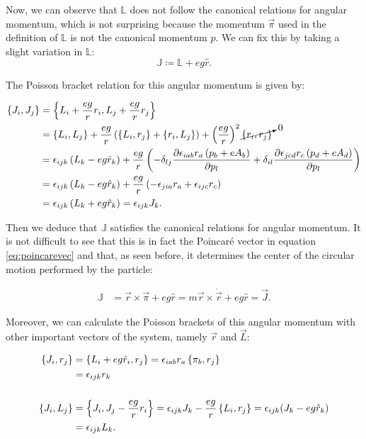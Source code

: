 Now, we can observe that $\mathbb{L}$ does not follow the canonical relations for angular momentum, which is not surprising because the momentum $\vec{\pi}$ used in the definition of $\mathbb{L}$ is not the canonical momentum $p$. We can fix this by taking a slight variation in $\mathbb{L}$:\\

\begin{equation}
\mathbb{J} \coloneqq \mathbb{L} + eg\hat{r}.
\label{eq:ham poincarevec}
\end{equation}

The Poisson bracket relation for this angular momentum is given by:

\begin{align*}
\left\lbrace J_i, J_j \right\rbrace &= \left\lbrace L_i + \frac{eg}{r}r_i, L_j + \frac{eg}{r}r_j \right\rbrace\\
&= \left\lbrace L_i, L_j \right\rbrace + \frac{eg}{r}\left( \left\lbrace L_i, r_j \right\rbrace +\left\lbrace r_i, L_j \right\rbrace \right) + \left( \frac{eg}{r} \right)^2\cancelto{0}{\left\lbrace r_i, r_j \right\rbrace}\\
& = \epsilon_{ijk}\left( L_k-{eg}\hat{r}_k \right)+\frac{eg}{r}\left( -\delta_{lj}\frac{\partial \epsilon_{iab}r_a\left( p_b+eA_b \right)}{\partial p_l}+ \delta_{il}\frac{\partial\epsilon_{jcd}r_c\left( p_d+eA_d \right)}{\partial p_l} \right)\\
& = \epsilon_{ijk}\left( L_k-{eg}\hat{r}_k \right)+ \frac{eg}{r}\left( -\epsilon_{jia}r_a+\epsilon_{ijc}r_c \right)\\
&= \epsilon_{ijk}\left( L_k+{eg}\hat{r}_k \right) = \epsilon_{ijk}J_k.
\end{align*}

Then we deduce that $\mathbb{J}$ satisfies the canonical relations for angular momentum. It is not difficult to see that this is in fact the Poincar\'e vector in equation \eqref{eq:poincarevec} and that, as seen before, it determines the center of the circular motion performed by the particle:

\begin{align*}
\mathbb{J} &= \vec{r}\times\vec{\pi}+{eg}\hat{r} = m{\vec{r}}\times\dot{\vec{r}} + eg\hat{r} = \vec{J}.
\end{align*}

Moreover, we can calculate the Poisson brackets of this angular momentum with other important vectors of the system, namely $\vec{r}$ and $\vec{L}$:

\begin{align*}
\left\lbrace J_i, r_j \right\rbrace &= \left\lbrace L_i+eg\hat{r}_i, r_j \right\rbrace =  \epsilon_{iab}r_a\left\lbrace \pi_b, r_j \right\rbrace \\
&= \epsilon_{ijk}r_k\\
\\
\left\lbrace J_i, L_j \right\rbrace &= \left\lbrace J_i, J_j-\frac{eg}{r}r_i \right\rbrace = \epsilon_{ijk}J_k-\frac{eg}{r}\left\lbrace L_i, r_j \right\rbrace =\epsilon_{ijk}(J_k-eg\hat{r}_k) \\
&= \epsilon_{ijk}L_k.
\end{align*}

